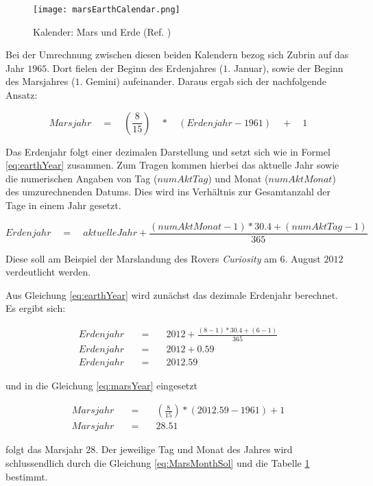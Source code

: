 \begin{figure}[H]
	\centering
	\texttt{[image: marsEarthCalendar.png]}
	\label{fig:marsEarthCalendar}
	\caption{Kalender: Mars und Erde (Ref. \cite{img2})}
\end{figure}

Bei der Umrechnung zwischen diesen beiden Kalendern bezog sich Zubrin auf das
Jahr $1965$. Dort fielen der Beginn des Erdenjahres ($1.$ Januar), sowie der
Beginn des Marsjahres ($1.$ Gemini) aufeinander. Daraus ergab sich der
nachfolgende Ansatz:

\begin{equation}
	Marsjahr \quad = \quad \left(\frac{8}{15}\right) \quad * \quad (Erdenjahr -
	1961) \quad + \quad 1
	\label{eq:marsYear}
\end{equation}

Das Erdenjahr folgt einer dezimalen Darstellung und setzt sich wie in Formel
\ref{eq:earthYear} zusammen. Zum Tragen kommen hierbei das aktuelle Jahr sowie
die numerischen Angaben von Tag ($numAktTag$) und Monat ($numAktMonat$) des
umzurechnenden Datums. Dies wird ins Verh{\"a}ltnis zur Gesamtanzahl der Tage in
einem Jahr gesetzt.

\begin{equation}
	Erdenjahr \quad = \quad aktuelleJahr + \frac{ (numAktMonat - 1) * 30.4 +
	(numAktTag - 1) }{365}
	\label{eq:earthYear}
\end{equation}

Diese soll am Beispiel der Marslandung des Rovers \textit{Curiosity} am
$6.$ August $2012$ verdeutlicht werden.

Aus Gleichung \ref{eq:earthYear} wird zun{\"a}chst das dezimale Erdenjahr
berechnet.
Es ergibt sich:

\begin{eqnarray}
	Erdenjahr \quad & = & \quad 2012 + \frac{ (8-1) * 30.4 + (6-1) }{365} \\
	Erdenjahr \quad & = & \quad 2012 + 0.59 \\
	Erdenjahr \quad & = & \quad 2012.59
\end{eqnarray}

und in die Gleichung \ref{eq:marsYear} eingesetzt

\begin{eqnarray}
	Marsjahr \quad & = & \quad \left(\frac{8}{15}\right) * (2012.59 - 1961) + 1 \\
	Marsjahr \quad & = & \quad 28.51
\end{eqnarray}

folgt das Marsjahr $28$. Der jeweilige Tag und Monat des Jahres wird
schlussendlich durch die Gleichung \ref{eq:MarsMonthSol} und die Tabelle
\ref{fig:marsEarthCalendar} bestimmt.

